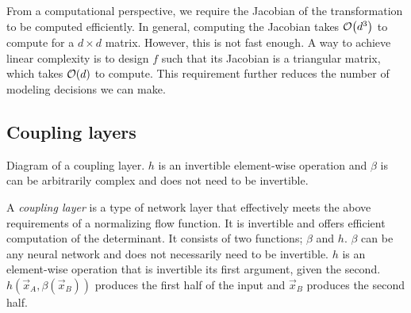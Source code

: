 From a computational perspective, we require the Jacobian of the transformation to be computed
efficiently. In general, computing the Jacobian takes $\bigo{d^3}$ to compute for a $d \times d$
matrix. However, this is not fast enough. A way to achieve linear complexity is to design $f$ such
that its Jacobian is a triangular matrix, which takes $\bigo{d}$ to compute. This requirement
further reduces the number of modeling decisions we can make.

\subsection{Coupling layers}

\begin{marginfigure}
    \centering
    \caption{Diagram of a coupling layer. $h$ is an invertible element-wise operation and $\beta$ is
        can be arbitrarily complex and does not need to be invertible.}
    \label{fig:coupling-layer}
\end{marginfigure}

A \textit{coupling layer} \citep{dinh2014nice} is a type of network layer that effectively meets
the above requirements of a normalizing flow function. It is invertible and offers efficient
computation of the determinant. It consists of two functions; $\beta$ and $h$. $\beta$ can be any
neural network and does not necessarily need to be invertible. $h$ is an element-wise operation that is invertible \wrt its first
argument, given the second. $h(\vec{x}_A, \beta(\vec{x}_B))$ produces the first half of the input
and $\vec{x}_B$ produces the second half.

